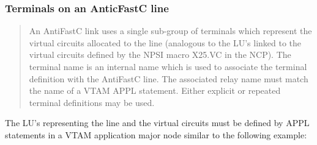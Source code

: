\documentclass[letterpaper,10pt,english]{sphinxmanual}
\begin{document}
\subsubsection{Terminals on an AnticFastC line}
\label{\detokenize{connectivity_guide:terminals-on-an-anticfastc-line}}\begin{quote}

An AntiFastC link uses a single sub-group of terminals which represent the virtual circuits allocated to the line (analogous to the LU’s linked to the virtual circuits defined by the NPSI macro X25.VC in the NCP). The terminal name is an internal name which is used to associate the terminal definition with the AntiFastC line. The associated relay name must match the name of a VTAM APPL statement. Either explicit or repeated terminal definitions may be used.
\end{quote}



The LU’s representing the line and the virtual circuits must be defined by APPL statements in a VTAM application major node similar to the following example:
\end{document}
